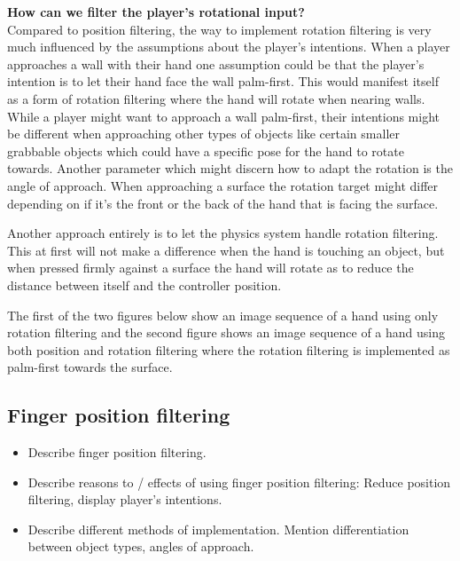 \textbf{How can we filter the player's rotational input?}\\
Compared to position filtering, the way to implement rotation filtering is very much influenced by the assumptions about the player's intentions. When a player approaches a wall with their hand one assumption could be that the player's intention is to let their hand face the wall palm-first. This would manifest itself as a form of rotation filtering where the hand will rotate when nearing walls. While a player might want to approach a wall palm-first, their intentions might be different when approaching other types of objects like certain smaller grabbable objects which could have a specific pose for the hand to rotate towards. Another parameter which might discern how to adapt the rotation is the angle of approach. When approaching a surface the rotation target might differ depending on if it's the front or the back of the hand that is facing the surface.

Another approach entirely is to let the physics system handle rotation filtering. This at first will not make a difference when the hand is touching an object, but when pressed firmly against a surface the hand will rotate as to reduce the distance between itself and the controller position.


The first of the two figures below show an image sequence of a hand using only rotation filtering and the second figure shows an image sequence of a hand using both position and rotation filtering where the rotation filtering is implemented as palm-first towards the surface.


\subsection{Finger position filtering}
\label{subsec:categoryFingerFiltering}
\begin{itemize}
\item Describe finger position filtering.
\item Describe reasons to / effects of using finger position filtering: Reduce position filtering, display player's intentions.
\item Describe different methods of implementation. Mention differentiation between object types, angles of approach.
\end{itemize}

